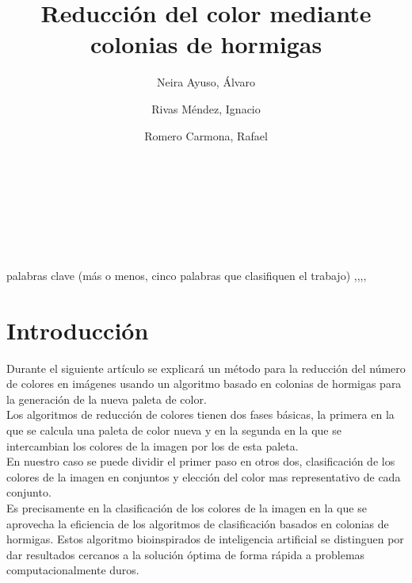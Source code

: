 \documentclass{pid}
\begin{document}
\begin{frontmatter}

\title{Reducción del color mediante colonias de hormigas}
\author{Neira Ayuso, Álvaro}\\
\author{Rivas Méndez, Ignacio}\\
\author{Romero Carmona, Rafael}\\

\maketitle

\begin{abstract}
\noindent

\end{abstract}

\begin{keyword} palabras clave (más o menos, cinco palabras que clasifiquen el trabajo) \sep \sep \sep \sep \end{keyword}
\end{frontmatter}

\section{Introducción}

Durante el siguiente artículo se explicará un método para la reducción del número de colores en imágenes usando un algoritmo basado en colonias de hormigas para la generación de la nueva paleta de color.\\

Los algoritmos de reducción de colores tienen dos fases básicas, la primera en la que se calcula una paleta de color nueva y en la segunda en la que se intercambian los colores de la imagen por los de esta paleta.\\

En nuestro caso se puede dividir el primer paso en otros dos, clasificación de los colores de la imagen en conjuntos y elección del color mas representativo de cada conjunto.\\

Es precisamente en la clasificación de los colores de la imagen en la que se aprovecha la eficiencia de los algoritmos de clasificación basados en colonias de hormigas. Estos algoritmo bioinspirados de inteligencia artificial se distinguen por dar resultados cercanos a la solución óptima de forma rápida a problemas computacionalmente duros.\\
\end{document}
